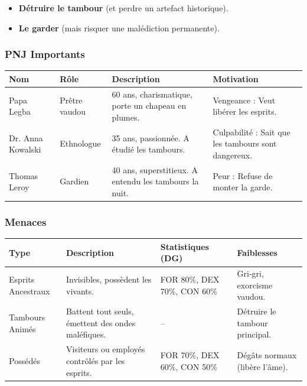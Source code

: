 \documentclass[10pt,a5paper,twoside]{book}
\begin{document}
\begin{itemize}
	\item \textbf{Détruire le tambour} (et perdre un artefact historique).
	\item \textbf{Le garder} (mais risquer une malédiction permanente).
\end{itemize}

\newpage

\subsubsection*{PNJ Importants}
\begin{center}
	\begin{tabular}{|P{2cm}|P{3cm}|P{3.5cm}|P{2.5cm}|}
	\hline
	\textbf{Nom} 		& \textbf{Rôle} 	& \textbf{Description} 										& \textbf{Motivation} \\ \hline
	Papa Legba 			& Prêtre vaudou 	& 60 ans, charismatique, porte un chapeau en plumes. 		& Vengeance : Veut libérer les esprits. \\ \hline
	Dr. Anna Kowalski 	& Ethnologue 		& 35 ans, passionnée. A étudié les tambours. 				& Culpabilité : Sait que les tambours sont dangereux. \\ \hline
	Thomas Leroy 		& Gardien 			& 40 ans, superstitieux. A entendu les tambours la nuit. 	& Peur : Refuse de monter la garde. \\ \hline
	\end{tabular}
\end{center}

\subsubsection*{Menaces}
\begin{center}
	\begin{tabular}{|P{2cm}|P{3cm}|P{3.5cm}|P{2.5cm}|}
	\hline
	\textbf{Type} 		& \textbf{Description} 									& \textbf{Statistiques (DG)} 	& \textbf{Faiblesses} \\ \hline
	Esprits Ancestraux 	& Invisibles, possèdent les vivants. 					& FOR 80\%, DEX 70\%, CON 60\% 	& Gri-gri, exorcisme vaudou. \\ \hline
	Tambours Animés 	& Battent tout seuls, émettent des ondes maléfiques. 	& -- 							& Détruire le tambour principal. \\ \hline
	Possédés 			& Visiteurs ou employés contrôlés par les esprits. 		& FOR 70\%, DEX 60\%, CON 50\% 	& Dégâts normaux (libère l'âme). \\ \hline
	\end{tabular}
\end{center}
\end{document}
